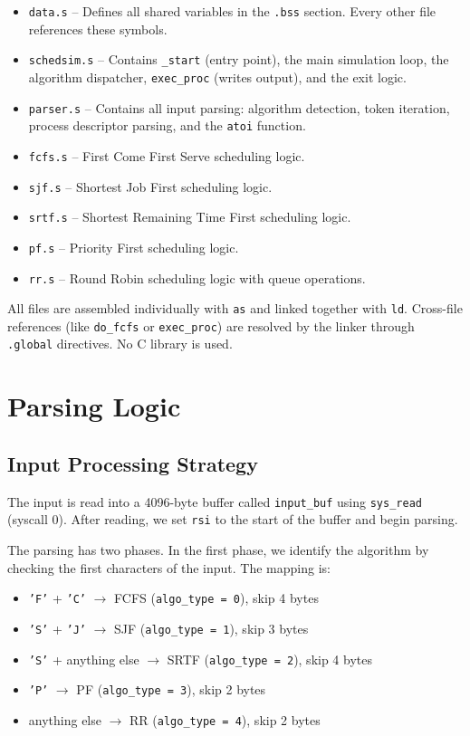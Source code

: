 \documentclass[a4paper,12pt]{article}
\begin{document}
\begin{itemize}
    \item \texttt{data.s} -- Defines all shared variables in the \texttt{.bss} section. Every other file references these symbols.
    \item \texttt{schedsim.s} -- Contains \texttt{\_start} (entry point), the main simulation loop, the algorithm dispatcher, \texttt{exec\_proc} (writes output), and the exit logic.
    \item \texttt{parser.s} -- Contains all input parsing: algorithm detection, token iteration, process descriptor parsing, and the \texttt{atoi} function.
    \item \texttt{fcfs.s} -- First Come First Serve scheduling logic.
    \item \texttt{sjf.s} -- Shortest Job First scheduling logic.
    \item \texttt{srtf.s} -- Shortest Remaining Time First scheduling logic.
    \item \texttt{pf.s} -- Priority First scheduling logic.
    \item \texttt{rr.s} -- Round Robin scheduling logic with queue operations.
\end{itemize}

All files are assembled individually with \texttt{as} and linked together with \texttt{ld}. Cross-file references (like \texttt{do\_fcfs} or \texttt{exec\_proc}) are resolved by the linker through \texttt{.global} directives. No C library is used.

\section{Parsing Logic}

\subsection{Input Processing Strategy}

The input is read into a 4096-byte buffer called \texttt{input\_buf} using \texttt{sys\_read} (syscall 0). After reading, we set \texttt{rsi} to the start of the buffer and begin parsing.

The parsing has two phases. In the first phase, we identify the algorithm by checking the first characters of the input. The mapping is:

\begin{itemize}
    \item \texttt{'F'} + \texttt{'C'} $\rightarrow$ FCFS (\texttt{algo\_type = 0}), skip 4 bytes
    \item \texttt{'S'} + \texttt{'J'} $\rightarrow$ SJF (\texttt{algo\_type = 1}), skip 3 bytes
    \item \texttt{'S'} + anything else $\rightarrow$ SRTF (\texttt{algo\_type = 2}), skip 4 bytes
    \item \texttt{'P'} $\rightarrow$ PF (\texttt{algo\_type = 3}), skip 2 bytes
    \item anything else $\rightarrow$ RR (\texttt{algo\_type = 4}), skip 2 bytes
\end{itemize}
\end{document}
